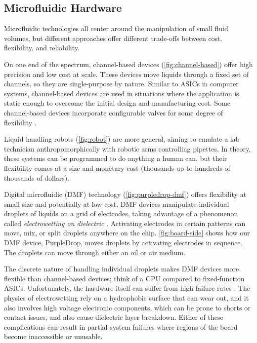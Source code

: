\documentclass[sigplan, screen]{acmart}
\begin{document}
\subsection{Microfluidic Hardware}

Microfluidic technologies all center around the manipulation of small fluid volumes, but different approaches offer different trade-offs between cost, flexibility, and reliability.

On one end of the spectrum, channel-based devices (\autoref{fig:channel-based}) offer high precision and low cost at scale.
These devices move liquids through a fixed set of channels, so they are single-purpose by nature.
Similar to ASICs in computer systems, channel-based devices are used in situations where the application is static enough to overcome the initial design and manufacturing cost.
Some channel-based devices incorporate configurable valves for some degree of flexibility \cite{amin2007aquacore, urbanski2006}.

Liquid handling robots (\autoref{fig:robot}) are more general, aiming to emulate a lab technician anthropomorphically with robotic arms controlling pipettes.
In theory, these systems can be programmed to do anything a human can, but their flexibility comes at a size and monetary cost (thousands up to hundreds of thousands of dollars).

Digital microfluidic (DMF) technology (\autoref{fig:purpledrop-dmf}) offers flexibility at small size and potentially at low cost.
DMF devices manipulate individual droplets of liquids on a grid of electrodes, taking advantage of a phenomenon called \emph{electrowetting on dielectric} \cite{pollack2000electrowetting}.
Activating electrodes in certain patterns can move, mix, or split droplets anywhere on the chip.
\autoref{fig:board-side} shows how our DMF device, PurpleDrop, moves droplets by activating electrodes in sequence.
The droplets can move through either an oil or air medium.

The discrete nature of handling individual droplets makes DMF devices more flexible than channel-based devices; think of a CPU compared to fixed-function ASICs.
Unfortunately, the hardware itself can suffer from high failure rates \cite{dmf-review}.
The physics of electrowetting rely on a hydrophobic surface that can wear out, and it also involves high voltage electronic components, which can be prone to shorts or contact issues, and also cause dielectric layer breakdown.
Either of these complications can result in partial system failures where regions of the board become inaccessible or unusable.
\end{document}
